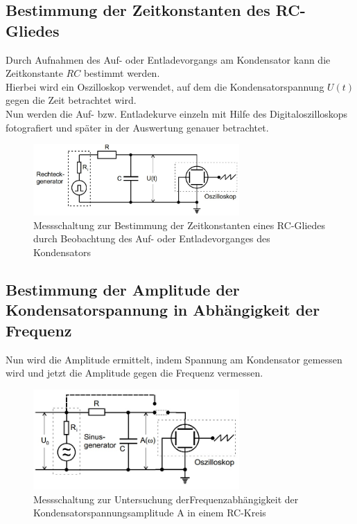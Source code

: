 \subsection{Bestimmung der Zeitkonstanten des RC-Gliedes}
Durch Aufnahmen des Auf- oder Entladevorgangs am Kondensator kann
die Zeitkonstante $RC$ bestimmt werden.\\
Hierbei wird ein Oszilloskop verwendet, auf dem die Kondensatorspannung $U(t)$ gegen die Zeit betrachtet wird. \\
Nun werden die Auf- bzw. Entladekurve einzeln mit Hilfe des Digitaloszilloskops fotografiert und später in der Auswertung genauer betrachtet.
\begin{figure}[h]
  \centering
  \includegraphics[width=0.7\textwidth]{Grafiken/V353_Abb1.jpg}
  \caption{Messschaltung zur Bestimmung der Zeitkonstanten eines RC-Gliedes durch Beobachtung des 
  Auf- oder Entladevorganges des Kondensators }
  \label{fig:V353_Abb1}
\end{figure}
\subsection{Bestimmung der Amplitude der Kondensatorspannung in
  Abhängigkeit der Frequenz}

Nun wird die Amplitude ermittelt, indem Spannung am Kondensator gemessen wird und jetzt die Amplitude gegen die Frequenz vermessen.
\begin{figure}[h]
  \centering
  \includegraphics[width=0.7\textwidth]{Grafiken/V353_Abb2.jpg}
  \caption{Messschaltung zur Untersuchung derFrequenzabhängigkeit der Kondensatorspannungsamplitude A in einem RC-Kreis}
  \label{fig:V353_Abb2}
\end{figure}

